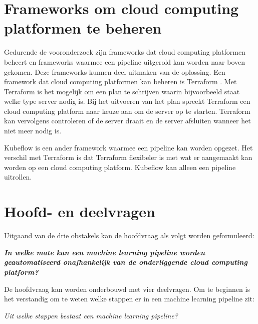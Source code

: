 \section{Frameworks om cloud computing platformen te beheren}\label{sec:frameworks-om-cloud-computing-platformen-te-beheren}
Gedurende de vooronderzoek zijn frameworks dat cloud computing platformen beheert en frameworks waarmee een pipeline uitgerold kan worden naar boven gekomen. Deze frameworks kunnen deel uitmaken van de oplossing. Een framework dat cloud computing platformen kan beheren is Terraform \cite{terraform}. Met Terraform is het mogelijk om een plan te schrijven waarin bijvoorbeeld staat welke type server nodig is. Bij het uitvoeren van het plan spreekt Terraform een cloud computing platform naar keuze aan om de server op te starten. Terraform kan vervolgens controleren of de server draait en de server afsluiten wanneer het niet meer nodig is.

Kubeflow \cite{kubeflow} is een ander framework waarmee een pipeline kan worden opgezet. Het verschil met Terraform is dat Terraform flexibeler is met wat er aangemaakt kan worden op een cloud computing platform. Kubeflow kan alleen een pipeline uitrollen.

\section{Hoofd- en deelvragen}\label{sec:hoofd-en-deelvragen}
Uitgaand van de drie obstakels kan de hoofdvraag als volgt worden geformuleerd:

\begin{quoting}
  \begin{center}
    \textbf{
      \textit{
        In welke mate kan een machine learning pipeline worden geautomatiseerd onafhankelijk van de onderliggende cloud computing platform?
      }
    }
  \end{center}
\end{quoting}\smallskip

De hoofdvraag kan worden onderbouwd met vier deelvragen. Om te beginnen is het verstandig om te weten welke stappen er in een machine learning pipeline zit:

\begin{quoting}
  \begin{center}
    \textit{
      Uit welke stappen bestaat een machine learning pipeline?
    }
  \end{center}
\end{quoting}\smallskip

